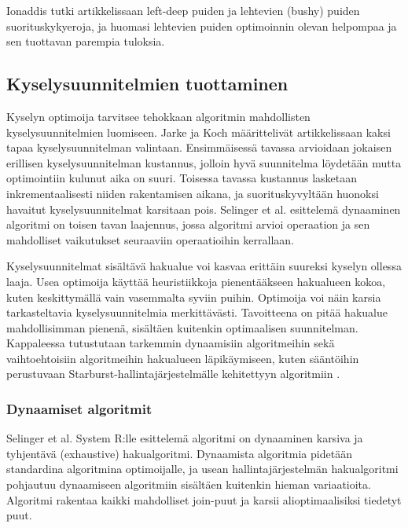 \documentclass[finnish]{tktltiki2}
\theoremstyle{definition}
\theoremstyle{remark}
\begin{document}
Ionaddis tutki artikkelissaan \cite{ioannidis1991left} left-deep puiden ja lehtevien (bushy) puiden suorituskykyeroja, ja huomasi lehtevien puiden optimoinnin olevan helpompaa ja sen tuottavan parempia tuloksia. 


\subsection{Kyselysuunnitelmien tuottaminen}
Kyselyn optimoija tarvitsee tehokkaan algoritmin mahdollisten kyselysuunnitelmien luomiseen. Jarke ja Koch määrittelivät artikkelissaan \cite{jarke1984} kaksi tapaa kyselysuunnitelman valintaan. Ensimmäisessä tavassa arvioidaan jokaisen erillisen kyselysuunnitelman kustannus, jolloin hyvä suunnitelma löydetään mutta optimointiin kulunut aika on suuri. Toisessa tavassa kustannus lasketaan inkrementaalisesti niiden rakentamisen aikana, ja suorituskyvyltään huonoksi havaitut kyselysuunnitelmat karsitaan pois. Selinger et al. esittelemä dynaaminen algoritmi \cite{selinger1979access} on toisen tavan laajennus, jossa algoritmi arvioi operaation ja sen mahdolliset vaikutukset seuraaviin operaatioihin kerrallaan.

Kyselysuunnitelmat sisältävä hakualue voi kasvaa erittäin suureksi kyselyn ollessa laaja. Usea optimoija käyttää heuristiikkoja pienentääkseen hakualueen kokoa, kuten keskittymällä vain vasemmalta syviin puihin. Optimoija voi näin karsia tarkasteltavia kyselysuunnitelmia merkittävästi. Tavoitteena on pitää hakualue mahdollisimman pienenä, sisältäen kuitenkin optimaalisen suunnitelman. \cite{jarke1984} Kappaleessa tutustutaan tarkemmin dynaamisiin algoritmeihin sekä vaihtoehtoisiin algoritmeihin hakualueen läpikäymiseen, kuten sääntöihin perustuvaan Starburst-hallintajärjestelmälle kehitettyyn algoritmiin \cite{lohman1988grammar}. 

\subsubsection{Dynaamiset algoritmit}
Selinger et al. System R:lle esittelemä algoritmi on dynaaminen karsiva ja tyhjentävä (exhaustive) hakualgoritmi. Dynaamista algoritmia pidetään standardina algoritmina optimoijalle, ja usean hallintajärjestelmän hakualgoritmi pohjautuu dynaamiseen algoritmiin sisältäen kuitenkin hieman variaatioita. Algoritmi rakentaa kaikki mahdolliset join-puut ja karsii alioptimaalisiksi tiedetyt puut.
\end{document}
